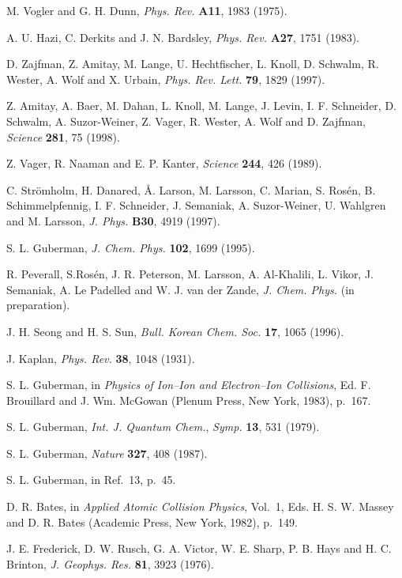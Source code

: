 \documentclass{ws-rv9x6}
\begin{document}
\begin{thebibliography}{000}
M. Vogler and G. H. Dunn, {\it Phys. Rev.} {\bf A11}, 1983 (1975).

A. U. Hazi, C. Derkits and J. N. Bardsley, {\it Phys. Rev.} {\bf A27},
1751 (1983).

D. Zajfman, Z. Amitay, M. Lange, U. Hechtfischer, L. Knoll,
D. Schwalm, R. Wester, A. Wolf and X. Urbain, {\it Phys. Rev. Lett.}
{\bf 79}, 1829 (1997).

Z. Amitay, A. Baer, M. Dahan, L. Knoll, M. Lange, J. Levin,
I. F. Schneider, D. Schwalm, A. Suzor-Weiner, Z.  Vager, R. Wester,
A. Wolf and D. Zajfman, {\it Science} {\bf 281}, 75 (1998).

Z. Vager, R. Naaman and E. P. Kanter, {\it Science} {\bf 244}, 426
(1989).

C. Str\"omholm, H. Danared, \AA. Larson, M. Larsson, C. Marian,
S. Ros\'en, B. Schimmelpfennig, I. F. Schneider, J. 
Semaniak, A. Suzor-Weiner, U. Wahlgren and M. Larsson,
{\it J. Phys.} {\bf B30}, 4919 (1997).

S. L. Guberman, {\it J. Chem. Phys.} {\bf 102}, 1699 (1995).

R. Peverall, S.Ros\'en, J. R. Peterson, M. Larsson, A. Al-Khalili,
L. Vikor, J. Semaniak, A. Le Padelled and W. J. van der Zande, {\it
J. Chem. Phys.} (in preparation).

J. H. Seong and H. S. Sun, {\it Bull. Korean Chem. Soc.} {\bf 17},
1065 (1996).

J. Kaplan, {\it Phys. Rev.} {\bf 38}, 1048 (1931).

S. L. Guberman, in {\it Physics of Ion--Ion and Electron--Ion
Collisions}, Ed. F. Brouillard and J. Wm. McGowan (Plenum Press, New York, 1983),
p.~167.

S. L. Guberman, {\it Int. J. Quantum Chem.}, {\it Symp.} {\bf 13}, 531
(1979).

S. L. Guberman, {\it Nature} {\bf 327}, 408 (1987).

S. L. Guberman, in Ref.~13, p.~45.

D. R. Bates, in {\it Applied Atomic Collision Physics}, Vol.~1,
Eds. H. S. W. Massey and D. R. Bates (Academic Press, New York, 1982),
p.~149.

J. E. Frederick, D. W. Rusch, G. A. Victor, W. E. Sharp, P. B. Hays
and H. C. Brinton, {\it J. Geophys. Res.} {\bf 81}, 3923 (1976).


\end{thebibliography}
\end{document}
